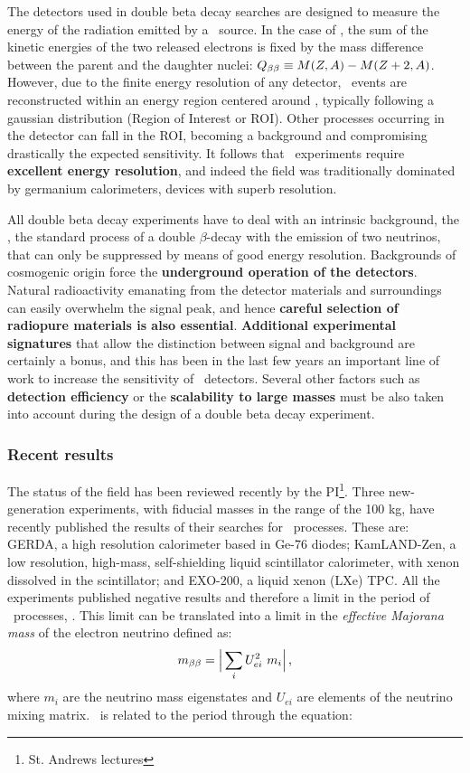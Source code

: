 The detectors used in double beta decay searches are designed to measure the energy of the radiation emitted by a \bb\ source. In the case of \bbonu, the sum of the kinetic energies of the two released electrons is fixed by the mass difference between the parent and the daughter nuclei: $Q_{\beta\beta} \equiv M(Z,A)-M(Z+2,A)$. However, due to the finite energy resolution of any detector, \bbonu\ events are reconstructed within an energy region centered around \Qbb, typically following a gaussian distribution (Region of Interest or ROI). Other processes occurring in the detector can fall in the ROI, becoming a background and compromising drastically the expected sensitivity. It follows that \bbonu\ experiments require {\bf excellent energy resolution}, and indeed the field was traditionally dominated by germanium calorimeters, devices with superb resolution.

All double beta decay experiments have to deal with an intrinsic background, the \bbtnu, the standard process of a double $\beta$-decay with the emission of two neutrinos, that can only be suppressed by means of good energy resolution. Backgrounds of cosmogenic origin force the {\bf underground operation of the detectors}. Natural radioactivity emanating from the detector materials and surroundings can easily overwhelm the signal peak, and hence {\bf careful selection of radiopure materials is also essential}. 
{\bf Additional experimental signatures} that allow the distinction between signal and background are certainly a bonus, and this has been in the last few years an important line of work to increase the sensitivity of \bbonu\ detectors. Several other factors such as {\bf detection efficiency} or the {\bf scalability to large masses} must be also taken into account during the design of a double beta decay experiment.
 
 \subsubsection*{Recent results}
 The status of the field has been reviewed recently by the PI\footnote{St. Andrews lectures}.
 Three new-generation experiments, with fiducial masses in the range of the 100 kg, have recently published the results of their searches for \bbonu\ processes. These are: GERDA, a high resolution calorimeter based in Ge-76 diodes; KamLAND-Zen, a low resolution, high-mass, self-shielding liquid scintillator calorimeter, with xenon dissolved in the scintillator; and EXO-200, a liquid xenon (LXe) TPC. All the experiments published negative results and therefore a limit in the period of \bbonu\ processes, \Tonu. This limit can be translated into a limit in the \emph{effective Majorana mass} of the electron neutrino defined as:
\begin{equation}
m_{\beta\beta} = \Big| \sum_{i} U^{2}_{ei} \ m_{i} \Big| \, ,
\end{equation}
%
where $m_{i}$ are the neutrino mass eigenstates and $U_{ei}$ are elements of the neutrino mixing matrix. \mbb\ is related to the period through the equation:

